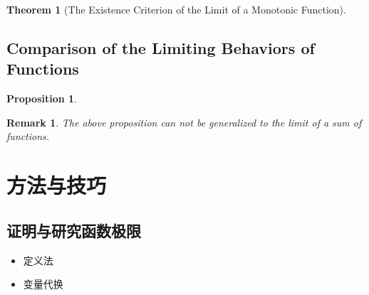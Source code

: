 \documentclass[onecolumn]{ctexart}
\newtheorem{theorem}{Theorem}
\newtheorem{proposition}{Proposition}
\newtheorem{remark}{Remark}
\begin{document}
\begin{theorem}[The Existence Criterion of the Limit of a Monotonic Function]
  
\end{theorem}

\subsection{Comparison of the Limiting Behaviors of Functions}

\begin{proposition}
  
\end{proposition}

\begin{remark}
  The above proposition can not be generalized to the limit of a sum of 
  functions.
\end{remark}

\section{方法与技巧}

\subsection{证明与研究函数极限}

\begin{itemize}
  \item 定义法
  \item 变量代换
\end{itemize}
\end{document}
